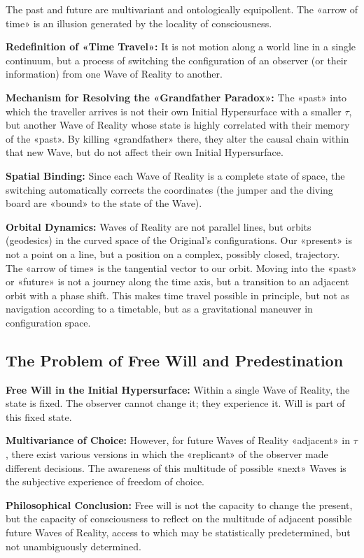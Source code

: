 \documentclass[a4paper,12pt]{article}
\begin{document}
	The past and future are multivariant and ontologically equipollent. The «arrow of time» is an illusion generated by the locality of consciousness.
	
	\textbf{Redefinition of «Time Travel»:} It is not motion along a world line in a single continuum, but a process of switching the configuration of an observer (or their information) from one Wave of Reality to another.
	
	\textbf{Mechanism for Resolving the «Grandfather Paradox»:} The «past» into which the traveller arrives is not their own Initial Hypersurface with a smaller $\tau$, but another Wave of Reality whose state is highly correlated with their memory of the «past». By killing «grandfather» there, they alter the causal chain within that new Wave, but do not affect their own Initial Hypersurface.
	
	\textbf{Spatial Binding:} Since each Wave of Reality is a complete state of space, the switching automatically corrects the coordinates (the jumper and the diving board are «bound» to the state of the Wave).
	
	\textbf{Orbital Dynamics:} Waves of Reality are not parallel lines, but orbits (geodesics) in the curved space of the Original's configurations. Our «present» is not a point on a line, but a position on a complex, possibly closed, trajectory. The «arrow of time» is the tangential vector to our orbit. Moving into the «past» or «future» is not a journey along the time axis, but a transition to an adjacent orbit with a phase shift. This makes time travel possible in principle, but not as navigation according to a timetable, but as a gravitational maneuver in configuration space.
	
	\subsection{The Problem of Free Will and Predestination}
	
	\textbf{Free Will in the Initial Hypersurface:} Within a single Wave of Reality, the state is fixed. The observer cannot change it; they experience it. Will is part of this fixed state.
	
	\textbf{Multivariance of Choice:} However, for future Waves of Reality «adjacent» in $\tau$, there exist various versions in which the «replicant» of the observer made different decisions. The awareness of this multitude of possible «next» Waves is the subjective experience of freedom of choice.
	
	\textbf{Philosophical Conclusion:} Free will is not the capacity to change the present, but the capacity of consciousness to reflect on the multitude of adjacent possible future Waves of Reality, access to which may be statistically predetermined, but not unambiguously determined.
	
\end{document}
